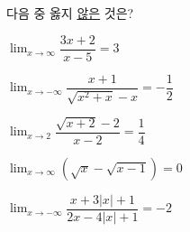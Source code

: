 다음 중 옳지 \underline{않은} 것은?
\begin{choicesii}{\rule[-3ex]{0pt}{8ex}$\displaystyle\lim_{x\to\infty}\dfrac{3x+2}{x-5}=3$}{\rule[-3ex]{0pt}{8ex}$\displaystyle\lim_{x\to -\infty}\dfrac{x+1}{\sqrt{x^2+x}-x}=-\dfrac{1}{2}$}{\rule[-3ex]{0pt}{8ex}$\displaystyle\lim_{x\to 2}\dfrac{\sqrt{x+2}-2}{x-2}=\dfrac{1}{4}$}{\rule[-3ex]{0pt}{8ex}$\displaystyle\lim_{x\to\infty}(\sqrt{x}-\sqrt{x-1})=0$}{\rule[-3ex]{0pt}{8ex}$\displaystyle\lim_{x\to -\infty}\dfrac{x+3|x|+1}{2x-4|x|+1}=-2$}\end{choicesii}

